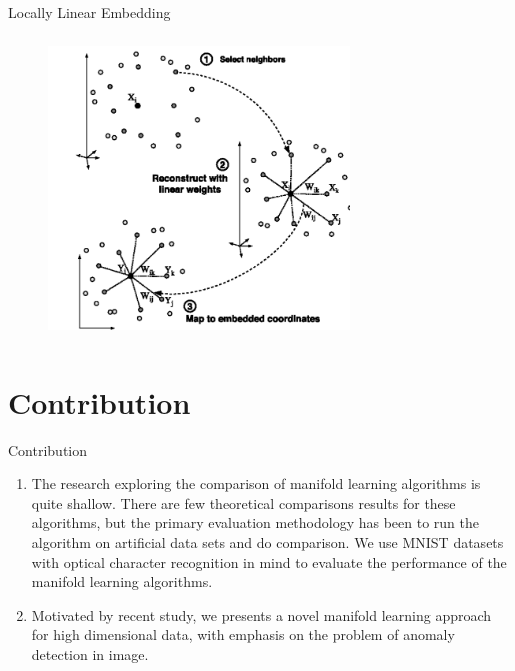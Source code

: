 \documentclass{beamer}
\theoremstyle{plain}
\theoremstyle{definition}
\theoremstyle{plain}
\theoremstyle{plain}
\begin{document}
\begin{frame}{Locally Linear Embedding}
\begin{figure}[ht]
\begin{center}
\includegraphics[width=8cm, height=8cm]{./figures/LLE.png}
\end{center}
\end{figure}
\end{frame}
\section{Contribution}
\begin{frame}{Contribution}
\begin{enumerate}
\item The research exploring the comparison of manifold learning algorithms is quite shallow. There are few theoretical comparisons results for these algorithms, but the primary evaluation methodology has been to run the
algorithm on artificial data sets and do comparison. We use MNIST datasets with optical character recognition in mind to evaluate the performance of the manifold learning algorithms.

\item Motivated by recent study, we presents a novel manifold learning approach for high dimensional data, with emphasis on the problem of anomaly detection in image.
\end{enumerate}


\end{frame}
\end{document}
